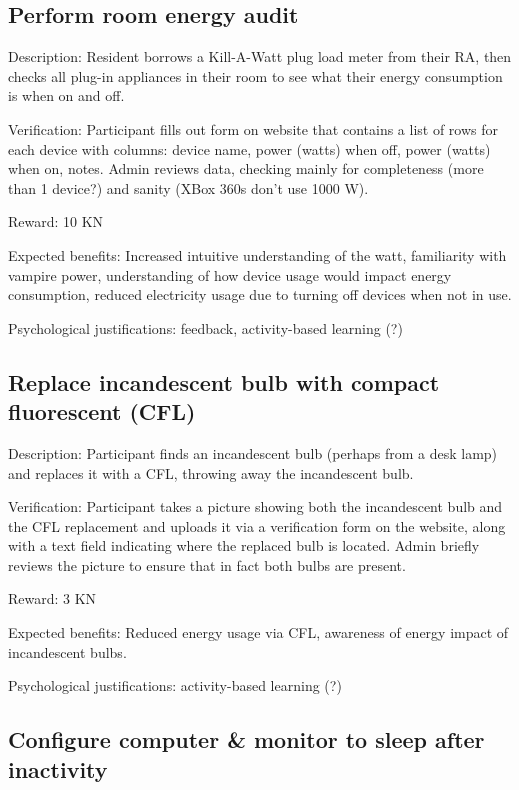 \subsection{Perform room energy audit}

Description: Resident borrows a Kill-A-Watt plug load meter from their RA, then checks all plug-in appliances in their room to see what their energy consumption is when on and off.

Verification: Participant fills out form on website that contains a list of rows for each device with columns: device name, power (watts) when off, power (watts) when on, notes. Admin reviews data, checking mainly for completeness (more than 1 device?) and sanity (XBox 360s don't use 1000 W).

Reward: 10 KN

Expected benefits: Increased intuitive understanding of the watt, familiarity with vampire power, understanding of how device usage would impact energy consumption, reduced electricity usage due to turning off devices when not in use.

Psychological justifications: feedback, activity-based learning (?)

\subsection{Replace incandescent bulb with compact fluorescent (CFL)}

Description: Participant finds an incandescent bulb (perhaps from a desk lamp) and replaces it with a CFL, throwing away the incandescent bulb.

Verification: Participant takes a picture showing both the incandescent bulb and the CFL replacement and uploads it via a verification form on the website, along with a text field indicating where the replaced bulb is located. Admin briefly reviews the picture to ensure that in fact both bulbs are present.

Reward: 3 KN

Expected benefits: Reduced energy usage via CFL, awareness of energy impact of incandescent bulbs.

Psychological justifications: activity-based learning (?)

\subsection{Configure computer \& monitor to sleep after inactivity}

